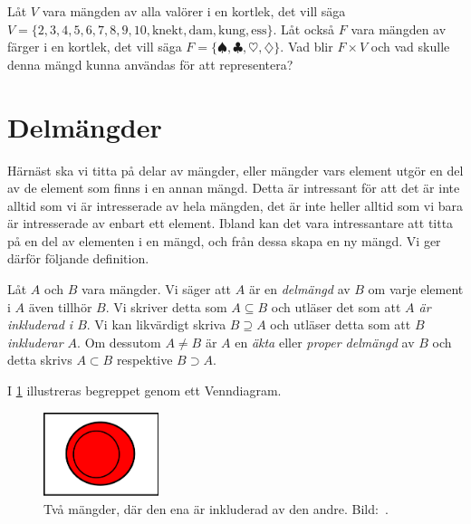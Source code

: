 \begin{exercise}\label{xrc:Kortlek}
  Låt \(V\) vara mängden av alla valörer i en kortlek, det vill säga
  \(V=\{2,3,4,5,6,7,8,9,10,\text{knekt},\text{dam},\text{kung},\text{ess}\}\).
  Låt också \(F\) vara mängden av färger i en kortlek, det vill säga
  \(F=\{\spadesuit,\clubsuit,\heartsuit,\diamondsuit\}\).
  Vad blir \(F\times V\) och vad skulle denna mängd kunna användas för att
  representera?
\end{exercise}


\section{Delmängder}
\label{sec:Delmangder}
Härnäst ska vi titta på delar av mängder, eller mängder vars
element utgör en del av de element som finns i en annan mängd.
Detta är intressant för att det är inte alltid som vi är intresserade av hela
mängden, det är inte heller alltid som vi bara är intresserade av enbart ett
element.
Ibland kan det vara intressantare att titta på en del av elementen i en mängd,
och från dessa skapa en ny mängd.
Vi ger därför följande definition.

\begin{definition}\label{def:Delmangd}
  Låt \(A\) och \(B\) vara mängder.
  Vi säger att \(A\) är en \emph{delmängd} av \(B\) om varje element i \(A\)
  även tillhör \(B\).
  Vi skriver detta som \(A\subseteq B\) och utläser det som att \emph{\(A\)
  är inkluderad i \(B\)}.
  Vi kan likvärdigt skriva \(B\supseteq A\) och utläser detta som att
  \emph{\(B\) inkluderar \(A\)}.
  Om dessutom \(A\neq B\) är \(A\) en \emph{äkta} eller \emph{proper
  delmängd} av \(B\) och detta skrivs \(A\subset B\) respektive
  \(B\supset A\).
\end{definition}
I \cref{fig:Delmangd} illustreras begreppet genom ett Venndiagram.
\begin{figure}
  \includegraphics[width=0.3\textwidth]{figs/subset.pdf}
  \caption{%
    Två mängder, där den ena är inkluderad av den andre.
    Bild:~\cite{Wikipedia2013Set}.
  }\label{fig:Delmangd}
\end{figure}


